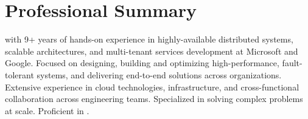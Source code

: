 \section{Professional Summary}
\small{\POSITION{} with 9+ years of hands-on experience in highly-available distributed systems, scalable
    architectures, and multi-tenant services development at Microsoft and Google. Focused on designing, 
    building and optimizing high-performance, fault-tolerant systems, and delivering end-to-end 
    solutions across organizations. Extensive experience in cloud technologies, infrastructure, and 
    cross-functional collaboration across engineering teams. Specialized in solving complex problems at 
    scale. Proficient in \LanguagesOrder\MainTechnologies.}
